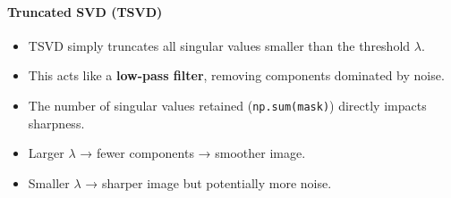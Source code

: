 \documentclass[11pt]{article}
\providecommand{\tightlist}{%
      \setlength{\itemsep}{0pt}\setlength{\parskip}{0pt}}
\begin{document}
    \hypertarget{truncated-svd-tsvd}{%
\paragraph{\texorpdfstring{\textbf{Truncated SVD
(TSVD)}}{Truncated SVD (TSVD)}}\label{truncated-svd-tsvd}}

\begin{itemize}
\tightlist
\item
  TSVD simply truncates all singular values smaller than the threshold
  \(\lambda\).
\item
  This acts like a \textbf{low-pass filter}, removing components
  dominated by noise.
\item
  The number of singular values retained (\texttt{np.sum(mask)})
  directly impacts sharpness.
\item
  Larger \(\lambda\) → fewer components → smoother image.
\item
  Smaller \(\lambda\) → sharper image but potentially more noise.
\end{itemize}
\end{document}
